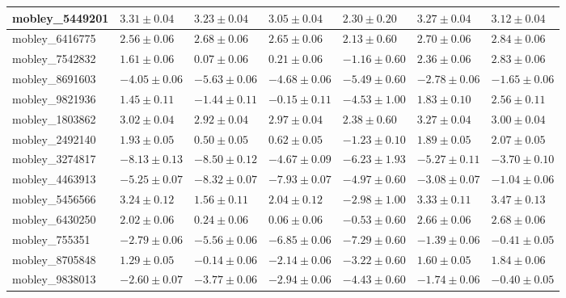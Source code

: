 \documentclass{article}
\begin{document}
\begin{landscape}
\begin{longtable}{|l{3.0cm}|l{3.0cm}|l{3.2cm}|l{3.6cm}|l{3.0cm}|l{3.0cm}|l{3.0cm}|}
mobley\_5449201	&	$	3.31	\pm	0.04	$	&	$	3.23	\pm	0.04	$	&	$	3.05	\pm	0.04	$	&	$	2.30	\pm	0.20	$	&	$	3.27	\pm	0.04	$	&	$	3.12	\pm	0.04	$	\\ \hline
mobley\_6416775	&	$	2.56	\pm	0.06	$	&	$	2.68	\pm	0.06	$	&	$	2.65	\pm	0.06	$	&	$	2.13	\pm	0.60	$	&	$	2.70	\pm	0.06	$	&	$	2.84	\pm	0.06	$	\\ \hline
mobley\_7542832	&	$	1.61	\pm	0.06	$	&	$	0.07	\pm	0.06	$	&	$	0.21	\pm	0.06	$	&	$	-1.16	\pm	0.60	$	&	$	2.36	\pm	0.06	$	&	$	2.83	\pm	0.06	$	\\ \hline
mobley\_8691603	&	$	-4.05	\pm	0.06	$	&	$	-5.63	\pm	0.06	$	&	$	-4.68	\pm	0.06	$	&	$	-5.49	\pm	0.60	$	&	$	-2.78	\pm	0.06	$	&	$	-1.65	\pm	0.06	$	\\ \hline
mobley\_9821936	&	$	1.45	\pm	0.11	$	&	$	-1.44	\pm	0.11	$	&	$	-0.15	\pm	0.11	$	&	$	-4.53	\pm	1.00	$	&	$	1.83	\pm	0.10	$	&	$	2.56	\pm	0.11	$	\\ \hline
mobley\_1803862	&	$	3.02	\pm	0.04	$	&	$	2.92	\pm	0.04	$	&	$	2.97	\pm	0.04	$	&	$	2.38	\pm	0.60	$	&	$	3.27	\pm	0.04	$	&	$	3.00	\pm	0.04	$	\\ \hline
mobley\_2492140	&	$	1.93	\pm	0.05	$	&	$	0.50	\pm	0.05	$	&	$	0.62	\pm	0.05	$	&	$	-1.23	\pm	0.10	$	&	$	1.89	\pm	0.05	$	&	$	2.07	\pm	0.05	$	\\ \hline
mobley\_3274817	&	$	-8.13	\pm	0.13	$	&	$	-8.50	\pm	0.12	$	&	$	-4.67	\pm	0.09	$	&	$	-6.23	\pm	1.93	$	&	$	-5.27	\pm	0.11	$	&	$	-3.70	\pm	0.10	$	\\ \hline
mobley\_4463913	&	$	-5.25	\pm	0.07	$	&	$	-8.32	\pm	0.07	$	&	$	-7.93	\pm	0.07	$	&	$	-4.97	\pm	0.60	$	&	$	-3.08	\pm	0.07	$	&	$	-1.04	\pm	0.06	$	\\ \hline
mobley\_5456566	&	$	3.24	\pm	0.12	$	&	$	1.56	\pm	0.11	$	&	$	2.04	\pm	0.12	$	&	$	-2.98	\pm	1.00	$	&	$	3.33	\pm	0.11	$	&	$	3.47	\pm	0.13	$	\\ \hline
mobley\_6430250	&	$	2.02	\pm	0.06	$	&	$	0.24	\pm	0.06	$	&	$	0.06	\pm	0.06	$	&	$	-0.53	\pm	0.60	$	&	$	2.66	\pm	0.06	$	&	$	2.68	\pm	0.06	$	\\ \hline
mobley\_755351	&	$	-2.79	\pm	0.06	$	&	$	-5.56	\pm	0.06	$	&	$	-6.85	\pm	0.06	$	&	$	-7.29	\pm	0.60	$	&	$	-1.39	\pm	0.06	$	&	$	-0.41	\pm	0.05	$	\\ \hline
mobley\_8705848	&	$	1.29	\pm	0.05	$	&	$	-0.14	\pm	0.06	$	&	$	-2.14	\pm	0.06	$	&	$	-3.22	\pm	0.60	$	&	$	1.60	\pm	0.05	$	&	$	1.84	\pm	0.06	$	\\ \hline
mobley\_9838013	&	$	-2.60	\pm	0.07	$	&	$	-3.77	\pm	0.06	$	&	$	-2.94	\pm	0.06	$	&	$	-4.43	\pm	0.60	$	&	$	-1.74	\pm	0.06	$	&	$	-0.40	\pm	0.05	$	\\ \hline

\end{longtable}
\end{landscape}
\end{document}
